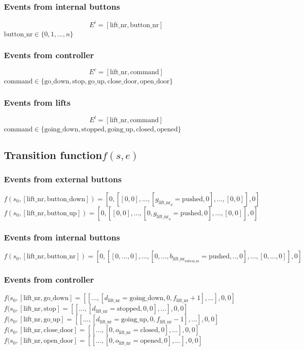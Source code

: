 \documentclass[12pt]{article}
\begin{document}
\subsubsection{Events from internal buttons}
\[ E^i = [\text{lift\_nr},\text{button\_nr}] \]
\(\text{button\_nr} \in \{0, 1,..., n\}\)

\subsubsection{Events from controller}
\[ E^c = [\text{lift\_nr}, \text{command}] \]
\(\text{command} \in \{\text{go\_down},\text{stop},\text{go\_up},\text{close\_door},\text{open\_door}\}\)

\subsubsection{Events from lifts}
\[ E^l = [\text{lift\_nr}, \text{command}] \]
\(\text{command} \in \{\text{going\_down},\text{stopped},\text{going\_up},\text{closed},\text{opened}\}\)

\subsection{Transition function\(f(s,e)\)}

\subsubsection{Events from external buttons}
\[
  f(s_0,[\text{lift\_nr},\text{button\_down}]) =
  [0,[[0,0],...,[g_{\text{lift\_nr}_d}=\text{pushed},0],...,[0,0]],0]
\]
\[
  f(s_0,[\text{lift\_nr},\text{button\_up}]) =
  [0,[[0,0],...,[0,g_{\text{lift\_nr}_u}=\text{pushed},0],...,[0,0]],0]
\]


\subsubsection{Events from internal buttons}
\[
  f(s_0,[\text{lift\_nr},\text{button\_nr}]) =
  [0,[[0,...,0],...,[0,...,b_{\text{lift\_nr}_\text{button\_nr}}=\text{pushed},..,0],...,[0,...,0]],0]
\]

\subsubsection{Events from controller}
\(
  f(s_0,[\text{lift\_nr},\text{go\_down}] =
  [[...,[d_\text{lift\_nr}=\text{going\_down},0,f_\text{lift\_nr}+1],...],0,0]
\)\\
\(
  f(s_0,[\text{lift\_nr},\text{stop}] =
  [[...,[d_\text{lift\_nr}=\text{stopped},0,0],...],0,0]
\)\\
\(
  f(s_0,[\text{lift\_nr},\text{go\_up}] =
  [[...,[d_\text{lift\_nr}=\text{going\_up},0,f_\text{lift\_nr}-1],...],0,0]
\)\\
\(
  f(s_0,[\text{lift\_nr},\text{close\_door}] =
  [[...,[0,o_\text{lift\_nr}=\text{closed},0],...],0,0]
\)\\
\(
  f(s_0,[\text{lift\_nr},\text{open\_door}] =
  [[...,[0,o_\text{lift\_nr}=\text{opened},0],...],0,0]
\)
\end{document}

